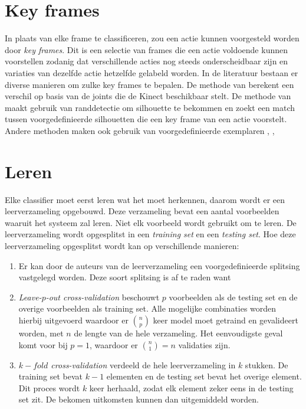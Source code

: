 \section{Key frames}
In plaats van elke frame te classificeren, zou een actie kunnen voorgesteld worden door \textit{key frames}. Dit is een selectie van frames die een actie voldoende kunnen voorstellen zodanig dat verschillende acties nog steeds onderscheidbaar zijn en variaties van dezelfde actie hetzelfde gelabeld worden. In de literatuur bestaan er diverse manieren om zulke key frames te bepalen. De methode van \cite{Suolan2017} berekent een verschil op basis van de joints die de Kinect beschikbaar stelt. De methode van \cite{Carlsson2001} maakt gebruik van randdetectie om silhouette te bekommen en zoekt een match tussen voorgedefinieerde silhouetten die een key frame van een actie voorstelt. Andere methoden maken ook gebruik van voorgedefinieerde exemplaren \cite{Weinland2008a}, \cite{Fathi2007},


\section{Leren}
Elke classifier moet eerst leren wat het moet herkennen, daarom wordt er een leerverzameling opgebouwd. Deze verzameling bevat een aantal voorbeelden waaruit het systeem zal leren. Niet elk voorbeeld wordt gebruikt om te leren. De leerverzameling wordt opgesplitst in een \textit{training set} en een \textit{testing set}. Hoe deze leerverzameling opgesplitst wordt kan op verschillende manieren:
\begin{enumerate}
	\item Er kan door de auteurs van de leerverzameling een voorgedefinieerde splitsing vastgelegd worden. Deze soort splitsing is af te raden want 
	\item \textit{Leave-$p$-out cross-validation} beschouwt $p$ voorbeelden als de testing set en de overige voorbeelden als training set. Alle mogelijke combinaties worden hierbij uitgevoerd waardoor er $\binom{n}{p}$ keer model moet getraind en gevalideert worden, met $n$ de lengte van de hele verzameling. Het eenvoudigste geval komt voor bij $p = 1$, waardoor er $\binom{n}{1} = n$ validaties zijn.
	\item \textit{$k-fold$ cross-validation} verdeeld de hele leerverzameling in $k$ stukken. De training set bevat $k - 1$ elementen en de testing set bevat het overige element. Dit proces wordt $k$ keer herhaald, zodat elk element zeker eens in de testing set zit. De bekomen uitkomsten kunnen dan uitgemiddeld worden.	
\end{enumerate} 
